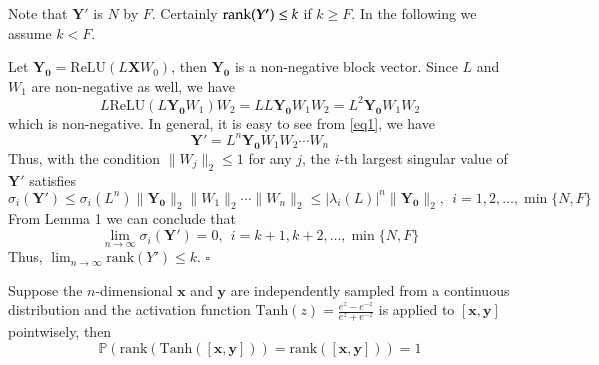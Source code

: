 \documentclass{article}
\newcommand\doubleP{\mathbb{P}}
\newenvironment{theorem}[2][Theorem]{\begin{trivlist}
		\item[\hskip \labelsep {\bfseries #1}\hskip \labelsep {\bfseries #2.}]}{\end{trivlist}}
\newenvironment{lemma}[2][Lemma]{\begin{trivlist}
		\item[\hskip \labelsep {\bfseries #1}\hskip \labelsep {\bfseries #2.}]}{\end{trivlist}}
\newenvironment{proof}{{\noindent\it Proof}\quad}{\hfill $\square$\par}
\begin{document}
\begin{appendices}
\begin{proof}

Note that $\bm{Y'}$ is $N$ by $F$.
Certainly $\operatorname{rank}(\bm{Y'})\leq k$ if $k\geq F$.
In the following we assume $k<F$.

Let $\bm{Y_0} = \mathrm{ReLU}(L\bm{X}W_0)$, then $\bm{Y_0}$ is a non-negative block vector.
Since $L$ and $W_1$ are non-negative as well, we have
$$
L \mathrm{ReLU}(L\bm{Y_0}W_1)W_2 = L L\bm{Y_0}W_1W_2 = L^2 \bm{Y_0}W_1W_2
$$
which is non-negative.
In general, it is easy to see from \eqref{eq1}, we have
$$
\bm{Y'} = L^n \bm{Y_0} W_1 W_2 \cdots W_n
$$
Thus, with the condition $\|W_j\|_2\leq 1$ for any $j$,
the $i$-th largest singular value of $\bm{Y'}$ satisfies
$$
\sigma_i(\bm{Y'}) \leq \sigma_i(L^n) \|\bm{Y_0}\|_2\|W_1\|_2\cdots\|W_n\|_2
\leq|\lambda_i(L)|^n \|\bm{Y_0}\|_2, \ \ i=1,2, \ldots, \min\{N,F\}
$$
From Lemma 1 we can conclude that
$$
\lim_{n\rightarrow \infty} \sigma_i(\bm{Y'}) = 0, \ \ i=k+1, k+2, \ldots, \min\{N,F\}
$$
Thus, $\lim_{n\rightarrow \infty}\mathrm{rank}(Y') \leq k$.
\end{proof}



\begin{theorem} 2
Suppose the $n$-dimensional $\bm{x}$ and   $\bm{y}$ are independently sampled from a continuous distribution and the activation function $\text{Tanh}(z) = \frac{e^z - e^{-z}}{e^z + e^{-z}}$ is applied to $[\bm{x},\bm{y}]$ pointwisely, then
$$\doubleP(\text{rank}\left(\text{Tanh}([\bm{x},\bm{y}])\right) = \text{rank}([\bm{x},\bm{y}])) = 1$$
\end{theorem}


\end{appendices}
\end{document}
